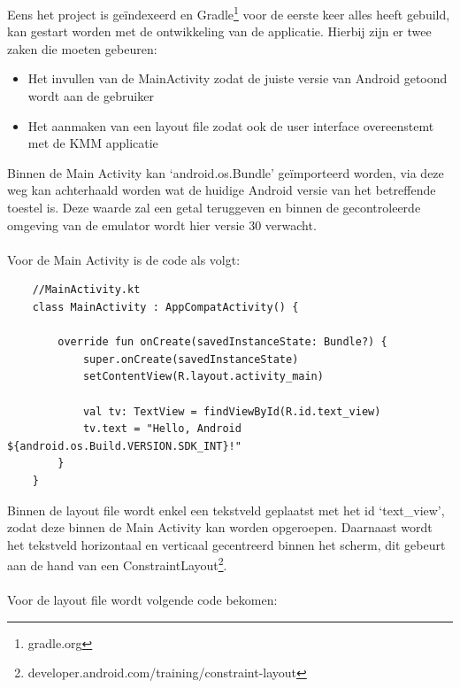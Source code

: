 Eens het project is geïndexeerd en Gradle\footnote{gradle.org} voor de eerste keer alles heeft gebuild, kan gestart worden met de ontwikkeling van de applicatie. Hierbij zijn er twee zaken die moeten gebeuren: 
\begin{itemize}
    \item Het invullen van de MainActivity zodat de juiste versie van Android getoond wordt aan de gebruiker
    \item Het aanmaken van een layout file zodat ook de user interface overeenstemt met de KMM applicatie
\end{itemize}

Binnen de Main Activity kan `android.os.Bundle' geïmporteerd worden, via deze weg kan achterhaald worden wat de huidige Android versie van het betreffende toestel is. Deze waarde zal een getal teruggeven en binnen de gecontroleerde omgeving van de emulator wordt hier versie 30 verwacht.
\\ \\
Voor de Main Activity is de code als volgt:

\begin{lstlisting}
    //MainActivity.kt
    class MainActivity : AppCompatActivity() {
        
        override fun onCreate(savedInstanceState: Bundle?) {
            super.onCreate(savedInstanceState)
            setContentView(R.layout.activity_main)
            
            val tv: TextView = findViewById(R.id.text_view)
            tv.text = "Hello, Android ${android.os.Build.VERSION.SDK_INT}!"
        }
    }
\end{lstlisting}

Binnen de layout file wordt enkel een tekstveld geplaatst met het id `text\_view', zodat deze binnen de Main Activity kan worden opgeroepen. Daarnaast wordt het tekstveld horizontaal en verticaal gecentreerd binnen het scherm, dit gebeurt aan de hand van een ConstraintLayout\footnote{developer.android.com/training/constraint-layout}.
\\ \\ 
Voor de layout file wordt volgende code bekomen:

